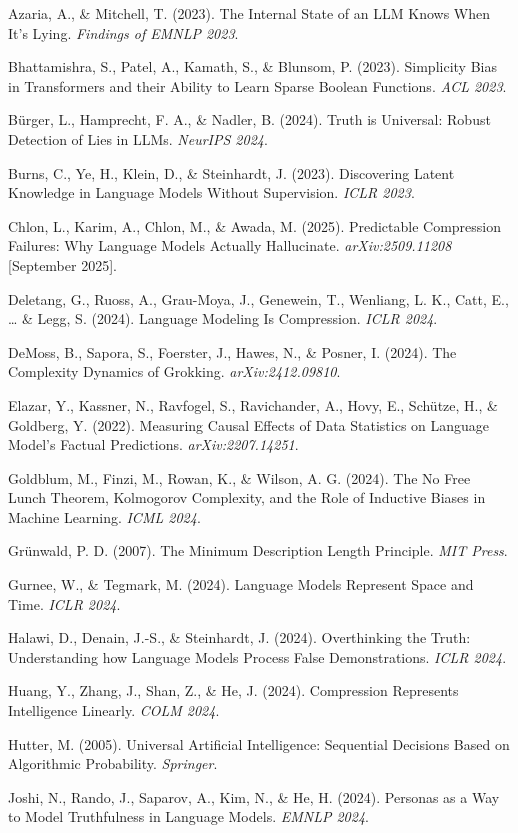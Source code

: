 \documentclass[
  11pt,
]{article}
\begin{document}
Azaria, A., \& Mitchell, T. (2023). The Internal State of an LLM Knows
When It's Lying. \emph{Findings of EMNLP 2023}.

Bhattamishra, S., Patel, A., Kamath, S., \& Blunsom, P. (2023).
Simplicity Bias in Transformers and their Ability to Learn Sparse
Boolean Functions. \emph{ACL 2023}.

Bürger, L., Hamprecht, F. A., \& Nadler, B. (2024). Truth is Universal:
Robust Detection of Lies in LLMs. \emph{NeurIPS 2024}.

Burns, C., Ye, H., Klein, D., \& Steinhardt, J. (2023). Discovering
Latent Knowledge in Language Models Without Supervision. \emph{ICLR
2023}.

Chlon, L., Karim, A., Chlon, M., \& Awada, M. (2025). Predictable
Compression Failures: Why Language Models Actually Hallucinate.
\emph{arXiv:2509.11208} {[}September 2025{]}.

Deletang, G., Ruoss, A., Grau-Moya, J., Genewein, T., Wenliang, L. K.,
Catt, E., \ldots{} \& Legg, S. (2024). Language Modeling Is Compression.
\emph{ICLR 2024}.

DeMoss, B., Sapora, S., Foerster, J., Hawes, N., \& Posner, I. (2024).
The Complexity Dynamics of Grokking. \emph{arXiv:2412.09810}.

Elazar, Y., Kassner, N., Ravfogel, S., Ravichander, A., Hovy, E.,
Schütze, H., \& Goldberg, Y. (2022). Measuring Causal Effects of Data
Statistics on Language Model's Factual Predictions.
\emph{arXiv:2207.14251}.

Goldblum, M., Finzi, M., Rowan, K., \& Wilson, A. G. (2024). The No Free
Lunch Theorem, Kolmogorov Complexity, and the Role of Inductive Biases
in Machine Learning. \emph{ICML 2024}.

Grünwald, P. D. (2007). The Minimum Description Length Principle.
\emph{MIT Press}.

Gurnee, W., \& Tegmark, M. (2024). Language Models Represent Space and
Time. \emph{ICLR 2024}.

Halawi, D., Denain, J.-S., \& Steinhardt, J. (2024). Overthinking the
Truth: Understanding how Language Models Process False Demonstrations.
\emph{ICLR 2024}.

Huang, Y., Zhang, J., Shan, Z., \& He, J. (2024). Compression Represents
Intelligence Linearly. \emph{COLM 2024}.

Hutter, M. (2005). Universal Artificial Intelligence: Sequential
Decisions Based on Algorithmic Probability. \emph{Springer}.

Joshi, N., Rando, J., Saparov, A., Kim, N., \& He, H. (2024). Personas
as a Way to Model Truthfulness in Language Models. \emph{EMNLP 2024}.
\end{document}
